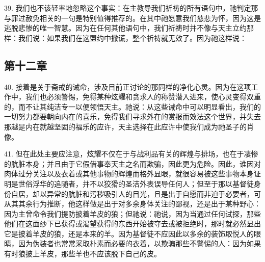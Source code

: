 39. 我们也不该轻率地忽略这个事实：在主教导我们祈祷的所有语句中，祂判定那与罪过赦免相关的一句是特别值得推荐的。在其中祂愿意我们慈悲为怀，因为这是逃脱悲惨的唯一智慧。因为在任何其他语句中，我们祈祷时并不像与天主立约那样：我们说：如果我们在这盟约中撒谎，整个祈祷就无效了。因为祂这样说：\par


\subsection{第十二章}

40. 接着是关于斋戒的诫命，涉及目前正讨论的那同样的净化心灵。因为在这项工作中，我们也必须警惕，免得某种炫耀和贪求人的称赞潜入进来，使心灵变得双重的，而不让其纯洁专一以便领悟天主。祂说：从这些诫命中可以明显看出，我们的一切努力都要朝向内在的喜乐，免得我们寻求外在的赏报而效法这个世界，并失去那越是内在就越坚固的福乐的应许，天主选择在此应许中使我们成为祂圣子的肖像。\par

41. 但在此处主要应注意，炫耀不仅在于与战利品有关的辉煌与排场，也在于凄惨的肮脏本身；并且由于它假借事奉天主之名而欺骗，因此更为危险。因此，谁因对肉体过分关注以及衣着或其他事物的辉煌而格外显眼，就很容易被这些事物本身证明是世俗浮华的追随者，并不以狡猾的圣洁外表误导任何人；但至于那以基督徒身份自居，却以异常的肮脏和污秽吸引人的目光，且是出于自愿而非迫于必要者，可从其其余行为推断，他这样做是出于对多余身体关注的鄙视，还是出于某种野心：因为主曾命令我们提防披着羊皮的狼；但祂说：祂说，因为当通过任何试探，那些他们在这面纱下已获得或渴望获得的东西开始被夺去或被拒绝时，那时就必然显出它是披着羊皮的狼，还是本来的羊。因为基督徒不应因此以多余的装饰取悦人的眼睛，因为伪装者也常常采取朴素而必要的衣着，以欺骗那些不警惕的人：因为如果有时狼披上羊皮，那些羊也不应该脱下自己的皮。\par

